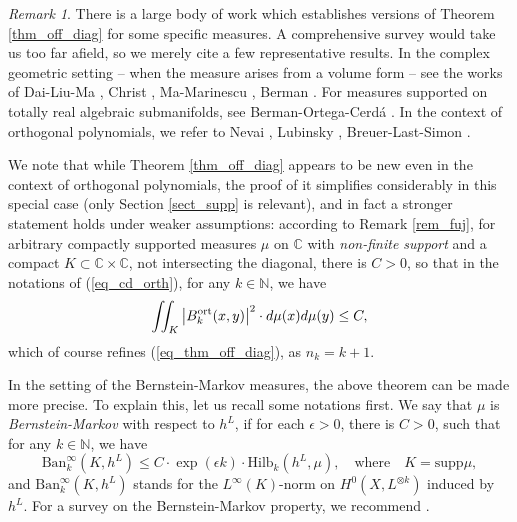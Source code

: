 \documentclass[12pt]{article}
\numberwithin{equation}{section}
\theoremstyle{theorem}
\theoremstyle{definition}
\theoremstyle{remark}
\newtheorem{rem}[thm]{Remark}
\newcommand{\comp}{\mathbb{C}}
\newcommand{\nat}{\mathbb{N}}
\begin{document}
	\begin{rem}\label{rem_off_diag}
		There is a large body of work which establishes versions of Theorem \ref{thm_off_diag} for some specific measures. A comprehensive survey would take us too far afield, so we merely cite a few representative results. 
		In the complex geometric setting -- when the measure arises from a volume form -- see the works of Dai-Liu-Ma \cite{DaiLiuMa}, Christ \cite{ChristBergmanOff}, Ma-Marinescu \cite{MaMarOffDiag}, Berman \cite{BermanEnvProj}.
		For measures supported on totally real algebraic submanifolds, see Berman-Ortega-Cerdá \cite{BermanOrtega}.
		In the context of orthogonal polynomials, we refer to Nevai \cite{Nevai}, Lubinsky \cite{LubinskyUnivers}, Breuer-Last-Simon \cite{NevaiCond}.
		\par 
		We note that while Theorem \ref{thm_off_diag} appears to be new even in the context of orthogonal polynomials, the proof of it simplifies considerably in this special case (only Section \ref{sect_supp} is relevant), and in fact a stronger statement holds under weaker assumptions: according to Remark \ref{rem_fuj}, for arbitrary compactly supported measures $\mu$ on $\comp$ with \textit{non-finite support} and a compact $K \subset \comp \times \comp$, not intersecting the diagonal, there is $C > 0$, so that in the notations of (\ref{eq_cd_orth}), for any $k \in \nat$, we have
		\begin{equation}\label{eq_rem_fuj}
			\iint_{K} \big|B_k^{{\rm{ort}}}(x, y)\big|^2 \cdot d \mu(x)  d \mu(y)
			\leq 
			C,
		\end{equation}
		which of course refines (\ref{eq_thm_off_diag}), as $n_k = k + 1$.
	\end{rem}
	\par 
	In the setting of the Bernstein-Markov measures, the above theorem can be made more precise.
	To explain this, let us recall some notations first.
	We say that $\mu$ is \textit{Bernstein-Markov} with respect to $h^L$, if for each $\epsilon > 0$, there is $C > 0$, such that for any $k \in \nat$, we have
	\begin{equation}\label{eq_bm_clas}
		{\textrm{Ban}}_k^{\infty}(K, h^L)
		\leq
		C
		\cdot
		\exp(\epsilon k)
		\cdot
		{\textrm{Hilb}}_k(h^L, \mu), \quad \text{where} \quad K = {\textrm{supp}} \mu,
	\end{equation}
	and ${\textrm{Ban}}_k^{\infty}(K, h^L)$ stands for the $L^{\infty}(K)$-norm on $H^0(X, L^{\otimes k})$ induced by $h^L$. 
	For a survey on the Bernstein-Markov property, we recommend \cite{BernsteinMarkovSurvey}.  
\end{document}
